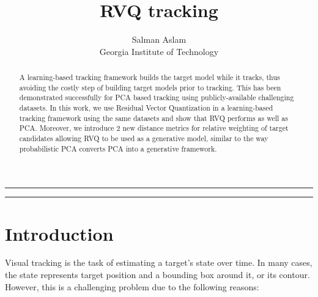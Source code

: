 
\title{RVQ tracking}
\author{Salman Aslam\\ Georgia Institute of Technology}
\date{}


\maketitle
\rule[0pt]{\textwidth}{1pt}
\tableofcontents
\rule[0pt]{\textwidth}{1pt}
\newcommand{\dr}{(\mathbf{x}_i-\boldsymbol\mu_k)^T(\mathbf{x}_i-\boldsymbol\mu_k) + \lambda({Q_{\textrm{max}}-Q_i})}

\begin{abstract}
A learning-based tracking framework builds the target model while it tracks, thus avoiding the costly step of building target models prior to tracking.  This has been demonstrated successfully for PCA based tracking using publicly-available challenging datasets.  In this work, we use Residual Vector Quantization in a learning-based tracking framework using the same datasets and show that RVQ performs as well as PCA.  Moreover, we introduce 2 new distance metrics for relative weighting of target candidates allowing RVQ to be used as a generative model, similar to the way probabilistic PCA converts PCA into a generative framework.
\end{abstract}

\section{Introduction}
Visual tracking is the task of estimating a target's state over time.  In many cases, the state represents target position and a bounding box around it, or its contour.  However, this is a challenging problem due to the following reasons:

